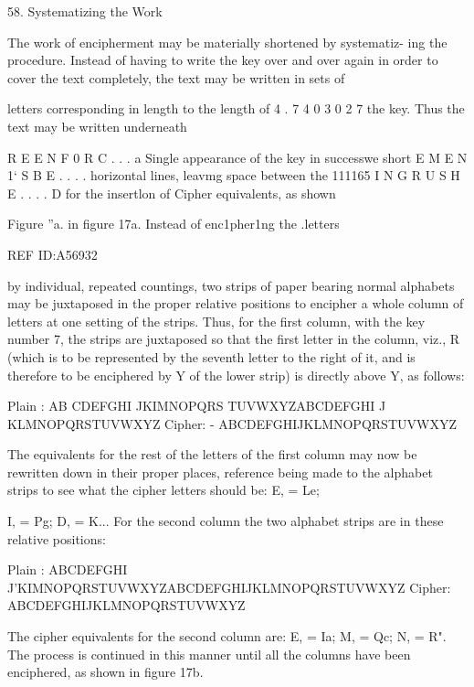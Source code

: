 {58. Systematizing the Work

The work of encipherment may be materially shortened by systematiz-
ing the procedure. Instead of having to write the key over and over again
in order to cover the text completely, the text may be written in sets of

letters corresponding in length to the length of
4 .
7 4 0 3 0 2 7 the key. Thus the text may be written underneath

R E E N F 0 R C . . .
a Single appearance of the key in successwe short
E M E N 1‘ S B E . . . .
horizontal lines, leavmg space between the 111165
I N G R U S H E . . . .
D for the insertlon of Cipher equivalents, as shown

Figure ”a. in ﬁgure 17a. Instead of enc1pher1ng the .letters

 

 

 

REF ID:A56932

by individual, repeated countings, two strips of paper bearing normal
alphabets may be juxtaposed in the proper relative positions to encipher
a whole column of letters at one setting of the strips. Thus, for the ﬁrst
column, with the key number 7, the strips are juxtaposed so that the ﬁrst
letter in the column, viz., R (which is to be represented by the seventh
letter to the right of it, and is therefore to be enciphered by Y of the
lower strip) is directly above Y, as follows:

Plain :
AB CDEFGHI JKIMNOPQRS TUVWXYZABCDEFGHI J KLMNOPQRSTUVWXYZ
Cipher: - ABCDEFGHIJKLMNOPQRSTUVWXYZ

The equivalents for the rest of the letters of the ﬁrst column may now
be rewritten down in their proper places, reference being made to the
alphabet strips to see what the cipher letters should be: E, = Le;

I, = Pg; D, = K... For the second column the two alphabet strips are
in these relative positions:

Plain :
ABCDEFGHI J'KIMNOPQRSTUVWXYZABCDEFGHIJKLMNOPQRSTUVWXYZ
Cipher: ABCDEFGHIJKLMNOPQRSTUVWXYZ

The cipher equivalents for the second column are: E, = Ia; M, = Qc;
N, = R". The process is continued in this manner until all the columns
have been enciphered, as shown in ﬁgure 17b.

 

 

 

 

}
